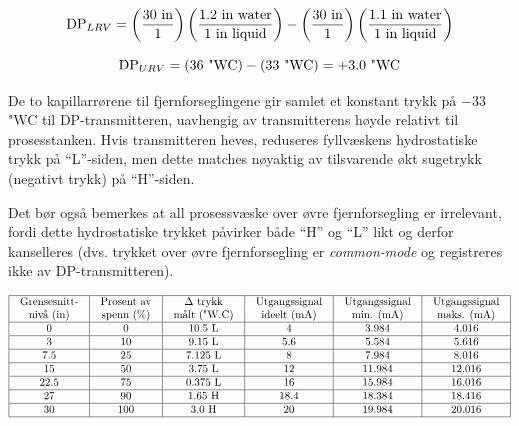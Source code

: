 $$\hbox{DP}_{LRV} = \left(30 \hbox{ in} \over 1 \right) \left(1.2 \hbox{ in water} \over 1 \hbox{ in liquid} \right) - \left(30 \hbox{ in} \over 1 \right) \left(1.1 \hbox{ in water} \over 1 \hbox{ in liquid} \right) $$

$$\hbox{DP}_{URV} = (36 \hbox{ "WC}) - (33 \hbox{ "WC}) = +3.0 \hbox{ "WC}$$

De to kapillarrørene til fjernforseglingene gir samlet et konstant trykk på $-33$ "WC til DP-transmitteren, uavhengig av transmitterens høyde relativt til prosesstanken.  Hvis transmitteren heves, reduseres fyllvæskens hydrostatiske trykk på ``L''-siden, men dette matches nøyaktig av tilsvarende økt sugetrykk (negativt trykk) på ``H''-siden.

Det bør også bemerkes at all prosessvæske over øvre fjernforsegling er irrelevant, fordi dette hydrostatiske trykket påvirker både ``H'' og ``L'' likt og derfor kanselleres (dvs. trykket over øvre fjernforsegling er {\it common-mode} og registreres ikke av DP-transmitteren).


$$\vbox{\offinterlineskip
\halign{\strut
\vrule \quad\hfil # \ \hfil & 
\vrule \quad\hfil # \ \hfil & 
\vrule \quad\hfil # \ \hfil & 
\vrule \quad\hfil # \ \hfil & 
\vrule \quad\hfil # \ \hfil & 
\vrule \quad\hfil # \ \hfil \vrule \cr
\noalign{\hrule}
%
Grensesnitt- & Prosent av & $\Delta$ trykk & Utgangssignal & Utgangssignal & Utgangssignal \cr
%
nivå (in) & spenn (\%) & målt ("W.C) & ideelt (mA) & min. (mA) & maks. (mA) \cr
%
\noalign{\hrule}
%
0 & 0 & 10.5 L & 4 & 3.984 & 4.016 \cr
%
\noalign{\hrule}
%
3 & 10 & 9.15 L & 5.6 & 5.584 & 5.616 \cr
%
\noalign{\hrule}
%
7.5 & 25 & 7.125 L & 8 & 7.984 & 8.016 \cr
%
\noalign{\hrule}
%
15 & 50 & 3.75 L & 12 & 11.984 & 12.016 \cr
%
\noalign{\hrule}
%
22.5 & 75 & 0.375 L & 16 & 15.984 & 16.016 \cr
%
\noalign{\hrule}
%
27 & 90 & 1.65 H & 18.4 & 18.384 & 18.416 \cr
%
\noalign{\hrule}
%
30 & 100 & 3.0 H & 20 & 19.984 & 20.016 \cr
%
\noalign{\hrule}
} %
}$$ %


